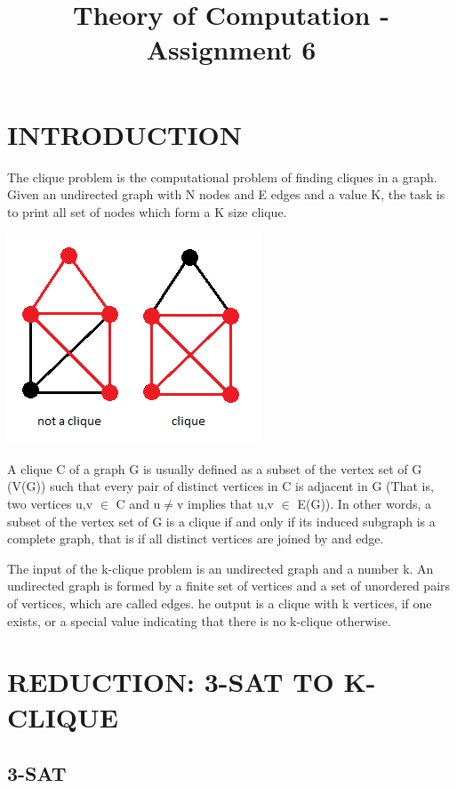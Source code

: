 \documentclass[table]{article}
\title{Theory of Computation - Assignment 6}
\begin{document}
\maketitle
\section{INTRODUCTION}

\leftskip=0.5in 
The clique problem is the computational problem of finding cliques in a graph. Given an undirected graph with N nodes and E edges and a value K, the task is to print all set of nodes which form a K size clique. 

\begin{center}
\includegraphics[scale=0.7]{MrlSG.png}
\end{center}

A clique C of a graph G is usually defined as a subset of the vertex set of G (V(G)) such that every pair of distinct vertices in C is adjacent in G (That is, two vertices u,v $\in$ C and u$\neq$v implies that u,v $\in$ E(G)). In other words, a subset of the vertex set of G is a clique if and only if its induced subgraph is a complete graph, that is if all distinct vertices are joined by and edge.\newline
 
The input of the k-clique problem is an undirected graph and a number k. 
An undirected graph is formed by a finite set of vertices and a set of unordered pairs of vertices, which are called edges. he output is a clique with k vertices, if one exists, or a special value indicating that there is no k-clique otherwise. \newline

\leftskip=0.0in 
\section{REDUCTION: 3-SAT TO K-CLIQUE}
\subsection{3-SAT}
\end{document}
